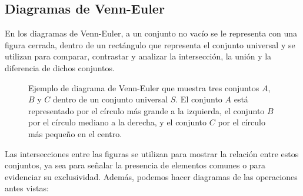 \newpage

\subsection{Diagramas de Venn-Euler}

En los diagramas de Venn-Euler, a un conjunto no vacío se le representa con una figura cerrada, dentro de un rectángulo que representa el conjunto universal y se utilizan para comparar, contrastar y analizar la intersección, la unión y la diferencia de dichos conjuntos.
\begin{figure}[h!]
    \centering
    \caption{Ejemplo de diagrama de Venn-Euler que muestra tres conjuntos $A$, $B$ y $C$ dentro de un conjunto universal $S$. El conjunto $A$ está representado por el círculo más grande a la izquierda, el conjunto $B$ por el círculo mediano a la derecha, y el conjunto $C$ por el círculo más pequeño en el centro.}
\end{figure}

\noindent Las intersecciones entre las figuras se utilizan para mostrar la relación entre estos conjuntos, ya sea para señalar la presencia de elementos comunes o para evidenciar su exclusividad. Además, podemos hacer diagramas de las operaciones antes vistas:
\def\firstcircle{(0,0) circle (1.5cm)}
\def\secondcircle{(0:2cm) circle (1.5cm)}



